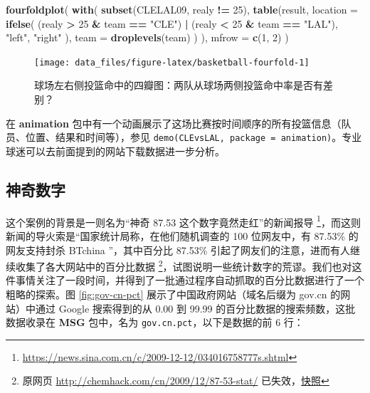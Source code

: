 \documentclass[
  b5paper,
  UTF8,twoside]{book}
\newenvironment{Shaded}{\begin{snugshade}}{\end{snugshade}}
\newcommand{\AttributeTok}[1]{\textcolor[rgb]{0.13,0.29,0.53}{#1}}
\newcommand{\DecValTok}[1]{\textcolor[rgb]{0.00,0.00,0.81}{#1}}
\newcommand{\FunctionTok}[1]{\textcolor[rgb]{0.13,0.29,0.53}{\textbf{#1}}}
\newcommand{\NormalTok}[1]{#1}
\newcommand{\SpecialCharTok}[1]{\textcolor[rgb]{0.81,0.36,0.00}{\textbf{#1}}}
\newcommand{\StringTok}[1]{\textcolor[rgb]{0.31,0.60,0.02}{#1}}
\begin{document}
\begin{Shaded}
\begin{Highlighting}[]
\FunctionTok{fourfoldplot}\NormalTok{(}
  \FunctionTok{with}\NormalTok{(}
    \FunctionTok{subset}\NormalTok{(CLELAL09, realy }\SpecialCharTok{!=} \DecValTok{25}\NormalTok{),}
    \FunctionTok{table}\NormalTok{(result,}
      \AttributeTok{location =} \FunctionTok{ifelse}\NormalTok{(}
\NormalTok{        (realy }\SpecialCharTok{\textgreater{}} \DecValTok{25} \SpecialCharTok{\&}\NormalTok{ team }\SpecialCharTok{==} \StringTok{"CLE"}\NormalTok{) }\SpecialCharTok{|}\NormalTok{ (realy }\SpecialCharTok{\textless{}} \DecValTok{25} \SpecialCharTok{\&}\NormalTok{ team }\SpecialCharTok{==} \StringTok{"LAL"}\NormalTok{),}
        \StringTok{"left"}\NormalTok{, }\StringTok{"right"}
\NormalTok{      ),}
      \AttributeTok{team =} \FunctionTok{droplevels}\NormalTok{(team)}
\NormalTok{    )}
\NormalTok{  ),}
  \AttributeTok{mfrow =} \FunctionTok{c}\NormalTok{(}\DecValTok{1}\NormalTok{, }\DecValTok{2}\NormalTok{)}
\NormalTok{)}
\end{Highlighting}
\end{Shaded}

\begin{figure}

{\centering \texttt{[image: data\_files/figure-latex/basketball-fourfold-1]} 

}

\caption[ 球场左右侧投篮命中的四瓣图 ]{球场左右侧投篮命中的四瓣图：两队从球场两侧投篮命中率是否有差别？}\label{fig:basketball-fourfold}
\end{figure}



在 \textbf{animation} 包中有一个动画展示了这场比赛按时间顺序的所有投篮信息（队员、位置、结果和时间等），参见 \texttt{demo(\textquotesingle{}CLEvsLAL\textquotesingle{},\ package\ =\ \textquotesingle{}animation\textquotesingle{})}。专业球迷可以去前面提到的网站下载数据进一步分析。

\subsection{神奇数字}\label{subsec:percentage}

这个案例的背景是一则名为``神奇 87.53 这个数字竟然走红''的新闻报导 \footnote{\url{https://news.sina.com.cn/c/2009-12-12/034016758777s.shtml}}，而这则新闻的导火索是``国家统计局称，在他们随机调查的 100 位网友中，有 87.53\% 的网友支持封杀 BTchina ''，其中百分比 87.53\% 引起了网友们的注意，进而有人继续收集了各大网站中的百分比数据 \footnote{原网页 \url{http://chemhack.com/cn/2009/12/87-53-stat/} 已失效，\href{https://web.archive.org/web/20120115032226/http://chemhack.com/cn/2009/12/87-53-stat/}{快照}}，试图说明一些统计数字的荒谬。我们也对这件事情关注了一段时间，并得到了一批通过程序自动抓取的百分比数据进行了一个粗略的探索。图 \ref{fig:gov-cn-pct} 展示了中国政府网站（域名后缀为 gov.cn 的网站）中通过 Google 搜索得到的从 0.00 到 99.99 的百分比数据的搜索频数，这批数据收录在 \textbf{MSG} 包中，名为 \texttt{gov.cn.pct}，以下是数据的前 6 行：
\end{document}
